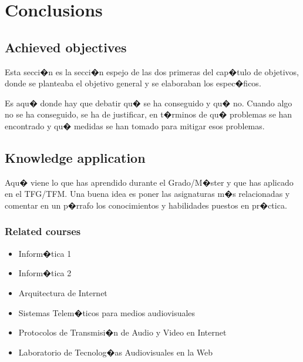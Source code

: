 \documentclass[a4paper, 12pt]{book}
\begin{document}

\cleardoublepage
\chapter{Conclusions}
\label{chap:conclusiones}


\section{Achieved objectives}
\label{sec:consecucion-objetivos}

Esta secci�n es la secci�n espejo de las dos primeras del cap�tulo de objetivos,
donde se planteaba el objetivo general y se elaboraban los espec�ficos.

Es aqu� donde hay que debatir qu� se ha conseguido y qu� no. Cuando algo no
se ha conseguido, se ha de justificar, en t�rminos de qu� problemas se han
encontrado y qu� medidas se han tomado para mitigar esos problemas.


\section{Knowledge application}
\label{sec:aplicacion}

Aqu� viene lo que has aprendido durante el Grado/M�ster y que has aplicado
en el TFG/TFM. Una buena idea es poner las asignaturas m�s relacionadas y
comentar en un p�rrafo los conocimientos y habilidades puestos en pr�ctica.

\subsection{Related courses}
\begin{itemize}
  \item Inform�tica 1
  \item Inform�tica 2
  \item Arquitectura de Internet
  \item Sistemas Telem�ticos para medios audiovisuales
  \item Protocolos de Transmisi�n de Audio y Video en Internet
  \item Laboratorio de Tecnolog�as Audiovisuales en la Web
\end{itemize}
\end{document}
